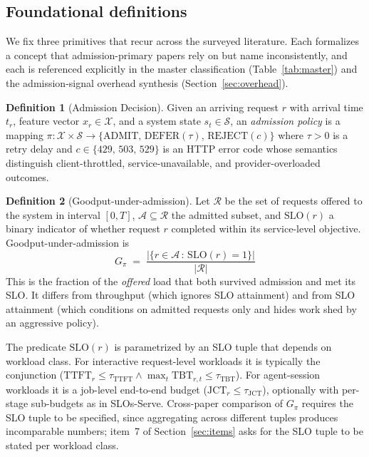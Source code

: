 \documentclass[10pt]{article} %
\theoremstyle{definition}
\newtheorem{definition}{Definition}
\begin{document}
\subsection{Foundational definitions}
\label{sec:defs}

We fix three primitives that recur across the surveyed literature.
Each formalizes a concept that admission-primary papers rely on but
name inconsistently, and each is referenced explicitly in the master
classification (Table~\ref{tab:master}) and the admission-signal
overhead synthesis (Section~\ref{sec:overhead}).

\begin{definition}[Admission Decision]
\label{def:admission}
Given an arriving request $r$ with arrival time $t_r$, feature vector
$x_r \in \mathcal{X}$, and a system state
$s_t \in \mathcal{S}$, an \emph{admission policy} is a mapping
$\pi : \mathcal{X} \times \mathcal{S} \to \{\mathrm{ADMIT},\,
\mathrm{DEFER}(\tau),\, \mathrm{REJECT}(c)\}$ where $\tau > 0$ is a
retry delay and $c \in \{429,\,503,\,529\}$ is an HTTP error code
whose semantics distinguish client-throttled, service-unavailable, and
provider-overloaded outcomes.
\end{definition}

\begin{definition}[Goodput-under-admission]
\label{def:goodput}
Let $\mathcal{R}$ be the set of requests offered to the system in
interval $[0, T]$, $\mathcal{A} \subseteq \mathcal{R}$ the admitted
subset, and $\mathrm{SLO}(r)$ a binary indicator of whether request $r$
completed within its service-level objective. Goodput-under-admission
is
%
\begin{equation}
G_\pi \;=\; \frac{|\{r \in \mathcal{A}\,:\,\mathrm{SLO}(r) = 1\}|}{|\mathcal{R}|}
\label{eq:goodput}
\end{equation}
%
This is the fraction of the \emph{offered} load that both survived
admission and met its SLO. It differs from throughput (which ignores
SLO attainment) and from SLO attainment (which conditions on admitted
requests only and hides work shed by an aggressive policy).

The predicate $\mathrm{SLO}(r)$ is parametrized by an SLO tuple that
depends on workload class. For interactive request-level workloads it
is typically the conjunction ($\mathrm{TTFT}_r \le \tau_{\text{TTFT}}
\wedge \max_t \mathrm{TBT}_{r,t} \le \tau_{\text{TBT}}$). For
agent-session workloads it is a job-level end-to-end budget
($\mathrm{JCT}_r \le \tau_{\text{JCT}}$), optionally with per-stage
sub-budgets as in SLOs-Serve. Cross-paper comparison of
$G_\pi$ requires the SLO tuple to be specified, since aggregating
across different tuples produces incomparable numbers; item~7 of
Section~\ref{sec:items} asks for the SLO tuple to be stated per
workload class.
\end{definition}
\end{document}

